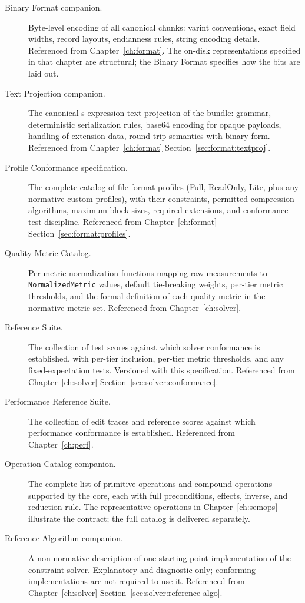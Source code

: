 \documentclass[11pt,letterpaper]{report}
\begin{document}
\begin{description}
  \item[Binary Format companion.] Byte-level encoding of all
    canonical chunks: varint conventions, exact field widths,
    record layouts, endianness rules, string encoding details.
    Referenced from Chapter~\ref{ch:format}. The on-disk
    representations specified in that chapter are structural;
    the Binary Format specifies how the bits are laid out.
  \item[Text Projection companion.] The canonical s-expression
    text projection of the bundle: grammar, deterministic
    serialization rules, base64 encoding for opaque payloads,
    handling of extension data, round-trip semantics with
    binary form. Referenced from Chapter~\ref{ch:format}
    Section~\ref{sec:format:textproj}.
  \item[Profile Conformance specification.] The complete
    catalog of file-format profiles (Full, ReadOnly, Lite, plus
    any normative custom profiles), with their constraints,
    permitted compression algorithms, maximum block sizes,
    required extensions, and conformance test discipline.
    Referenced from Chapter~\ref{ch:format}
    Section~\ref{sec:format:profiles}.
  \item[Quality Metric Catalog.] Per-metric normalization
    functions mapping raw measurements to \texttt{NormalizedMetric}
    values, default tie-breaking weights, per-tier metric
    thresholds, and the formal definition of each quality
    metric in the normative metric set. Referenced from
    Chapter~\ref{ch:solver}.
  \item[Reference Suite.] The collection of test scores against
    which solver conformance is established, with per-tier
    inclusion, per-tier metric thresholds, and any
    fixed-expectation tests. Versioned with this specification.
    Referenced from Chapter~\ref{ch:solver}
    Section~\ref{sec:solver:conformance}.
  \item[Performance Reference Suite.] The collection of edit
    traces and reference scores against which performance
    conformance is established. Referenced from
    Chapter~\ref{ch:perf}.
  \item[Operation Catalog companion.] The complete list of
    primitive operations and compound operations supported by
    the core, each with full preconditions, effects, inverse,
    and reduction rule. The representative operations in
    Chapter~\ref{ch:semops} illustrate the contract; the full
    catalog is delivered separately.
  \item[Reference Algorithm companion.] A non-normative
    description of one starting-point implementation of the
    constraint solver. Explanatory and diagnostic only;
    conforming implementations are not required to use it.
    Referenced from Chapter~\ref{ch:solver}
    Section~\ref{sec:solver:reference-algo}.
\end{description}
\end{document}
